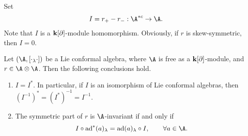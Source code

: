 \documentclass[12pt]{amsart}
\begin{document}
Set
\begin{equation*}
I=r_+-r_-:\A^{*c}\rightarrow \A.
\end{equation*}
Note that $I$ is a ${\bf k}[\partial]$-module homomorphism.  Obviously, if $r$ is skew-symmetric, then $I=0$. %
\begin{lemma}\label{I}
Let $ (\A,[\cdot_\lambda\cdot])$ be a Lie conformal algebra, where
$\A$ is free as a ${\bf k}[\partial]$-module, and $r\in \A\otimes
\A$. Then the following conclusions hold.
\begin{enumerate}
    \item \label{item1}$I=I^*$. In particular, if $I$ is an isomorphism of Lie conformal algebras, then $(I^{-1})^*=(I^*)^{-1}=I^{-1}$.
    \item \label{item2}The symmetric part of $r$ is $\A$-invariant if and only if
   \begin{equation}\label{eq:rr1}
   	 I\circ {\rm ad}^*(a)_\lambda={\rm ad}(a)_\lambda\circ I,\qquad \forall a\in \A.
   	 \end{equation}
 
\end{enumerate}
\end{lemma}
\end{document}
